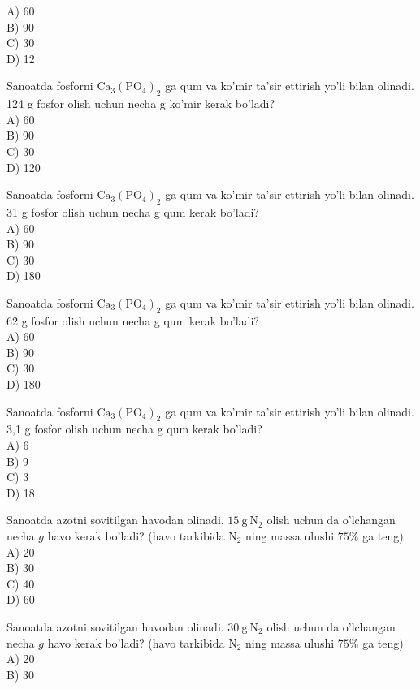 A) 60\\
B) 90\\
C) 30\\
D) 12
  \item Sanoatda fosforni $\mathrm{Ca}_{3}\left(\mathrm{PO}_{4}\right)_{2}$ ga qum va ko'mir ta'sir ettirish yo'li bilan olinadi. 124 g fosfor olish uchun necha g ko'mir kerak bo'ladi?\\
A) 60\\
B) 90\\
C) 30\\
D) 120
  \item Sanoatda fosforni $\mathrm{Ca}_{3}\left(\mathrm{PO}_{4}\right)_{2}$ ga qum va ko'mir ta'sir ettirish yo'li bilan olinadi. 31 g fosfor olish uchun necha g qum kerak bo'ladi?\\
A) 60\\
B) 90\\
C) 30\\
D) 180
  \item Sanoatda fosforni $\mathrm{Ca}_{3}\left(\mathrm{PO}_{4}\right)_{2}$ ga qum va ko'mir ta'sir ettirish yo'li bilan olinadi. 62 g fosfor olish uchun necha g qum kerak bo'ladi?\\
A) 60\\
B) 90\\
C) 30\\
D) 180
  \item Sanoatda fosforni $\mathrm{Ca}_{3}\left(\mathrm{PO}_{4}\right)_{2}$ ga qum va ko'mir ta'sir ettirish yo'li bilan olinadi. 3,1 g fosfor olish uchun necha g qum kerak bo'ladi?\\
A) 6\\
B) 9\\
C) 3\\
D) 18
  \item Sanoatda azotni sovitilgan havodan olinadi. $15 \mathrm{~g} \mathrm{~N}_{2}$ olish uchun da o'lchangan necha $g$ havo kerak bo'ladi? (havo tarkibida $\mathrm{N}_{2}$ ning massa ulushi $75 \%$ ga teng)\\
A) 20\\
B) 30\\
C) 40\\
D) 60
  \item Sanoatda azotni sovitilgan havodan olinadi. $30 \mathrm{~g} \mathrm{~N}_{2}$ olish uchun da o'lchangan necha $g$ havo kerak bo'ladi? (havo tarkibida $\mathrm{N}_{2}$ ning massa ulushi $75 \%$ ga teng)\\
A) 20\\
B) 30\\
